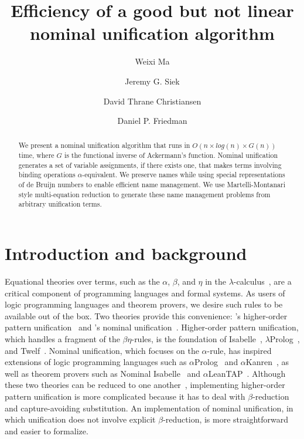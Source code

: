 \documentclass[a4paper,UKenglish]{lipics-v2016}
\title{Efficiency of a good but not linear nominal unification algorithm}
\author[1]{Weixi Ma}
\author[2]{Jeremy G. Siek}
\author[3]{David Thrane Christiansen}
\author[4]{Daniel P. Friedman}
\affil[1]{Indiana University,
\texttt{mvc@iu.edu}}
\affil[2]{Indiana University,
\texttt{jsiek@indiana.edu}}
\affil[3]{Galois, Inc.,
\texttt{dtc@galois.com}}
\affil[4]{Indiana University,
\texttt{dfried@indiana.edu}}
\begin{document}
\maketitle

\begin{abstract}
We present a nominal unification algorithm that runs in $O(n \times
log(n) \times G(n))$ time, where $G$ is the functional inverse of
Ackermann's function. Nominal unification generates a set of
variable assignments, if there exists one, that makes terms
involving binding operations $\alpha$-equivalent. We preserve names
while using special representations of de Bruijn numbers
to enable efficient name management.
We use Martelli-Montanari style multi-equation reduction
to generate these name management problems from arbitrary unification terms.
\end{abstract}

\section{Introduction and background}

Equational theories over terms, such as the $\alpha$, $\beta$, and $\eta$
in the $\lambda$-calculus~\citep{church_calculi_1941}, are
a critical component of
programming languages and formal systems. As users of logic
programming languages and theorem provers, we desire such rules to be
available out of the box. Two theories provide
this convenience: \citeauthor{miller_logic_1989}'s higher-order pattern unification~\citep{miller_logic_1989} and \citeauthor{urban_nominal_2004}'s nominal unification~\citep{urban_nominal_2004}. Higher-order pattern unification, which
handles a fragment of the $\beta\eta$-rules, is the foundation of
Isabelle~\citep{paulson_natural_1986},
$\lambda$Prolog~\citep{nadathur_overview_1988}, and
Twelf~\citep{pfenning_system_1999}. Nominal unification, which
focuses on the $\alpha$-rule, has inspired extensions of logic
programming languages such as $\alpha$Prolog~\citep{cheney_prolog:_2004}
and $\alpha$Kanren~\citep{byrd_kanren_2007}, as well as theorem
provers such as Nominal Isabelle~\citep{urban_nominal_2005} and
$\alpha$LeanTAP~\citep{near_leantap:_2008}. Although these two
theories can be reduced to one another~\citep{cheney_relating_2005,
levy_nominal_2012}, implementing higher-order pattern unification is
more complicated because it has to deal with $\beta$-reduction and
capture-avoiding substitution. An implementation of nominal unification,
in which unification does not involve explicit $\beta$-reduction,
is more straightforward and easier to formalize.
\end{document}
